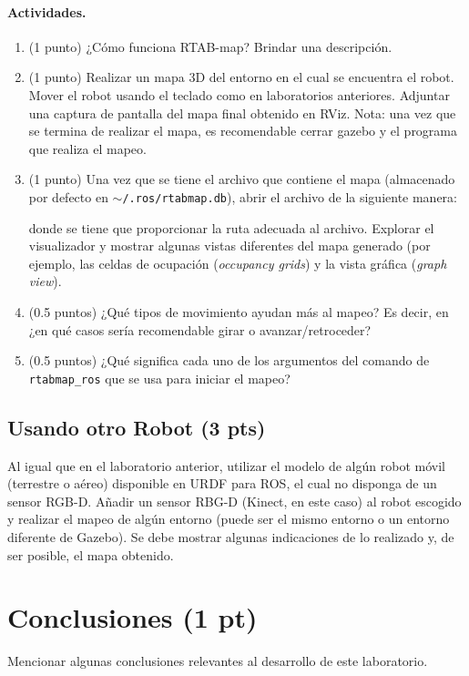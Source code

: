 \documentclass[a4paper,11pt]{robotlabs}
\begin{document}
\paragraph{Actividades.}
\begin{enumerate}
\item (1 punto)  ¿Cómo funciona RTAB-map? Brindar una descripción.
\item (1 punto) Realizar un mapa 3D del entorno en el cual se encuentra el
  robot. Mover el robot usando el teclado como en laboratorios
  anteriores. Adjuntar una captura de pantalla del mapa final obtenido en
  RViz. Nota: una vez que se termina de realizar el mapa, es recomendable
  cerrar gazebo y el programa que realiza el mapeo.
\item (1 punto) Una vez que se tiene el archivo que contiene el mapa
  (almacenado por defecto en \texttt{$\sim$/.ros/rtabmap.db}), abrir el archivo
  de la siguiente manera:
donde se tiene que proporcionar la ruta adecuada al archivo. Explorar el
visualizador y mostrar algunas vistas diferentes del mapa generado (por
ejemplo, las celdas de ocupación (\textit{occupancy grids}) y la vista gráfica
(\textit{graph view}).

\item (0.5 puntos) ¿Qué tipos de movimiento ayudan más al mapeo? Es decir, en
  ¿en qué casos sería recomendable girar o avanzar/retroceder?

\item (0.5 puntos) ¿Qué significa cada uno de los argumentos del comando de
  \texttt{rtabmap\_ros} que se usa para iniciar el mapeo?

\end{enumerate}


\subsection{Usando otro Robot (3 pts)}

Al igual que en el laboratorio anterior, utilizar el modelo de algún robot
móvil (terrestre o aéreo) disponible en URDF para ROS, el cual no disponga de
un sensor RGB-D. Añadir un sensor RBG-D (Kinect, en este caso) al robot
escogido y realizar el mapeo de algún entorno (puede ser el mismo entorno o un
entorno diferente de Gazebo). Se debe mostrar algunas indicaciones de lo
realizado y, de ser posible, el mapa obtenido.


\section{Conclusiones (1 pt)}

Mencionar algunas conclusiones relevantes al desarrollo de este laboratorio.


  
\end{document}
